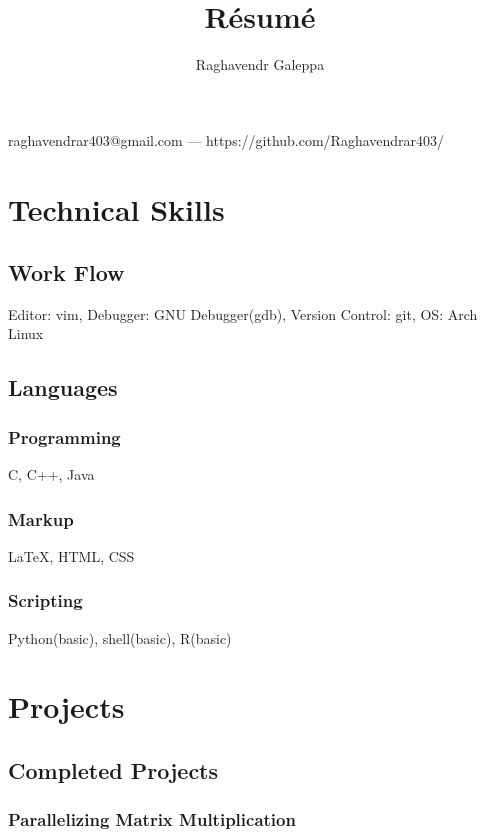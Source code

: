\documentclass{article}
\makeatletter
\renewcommand{\maketitle}{
\begin{center} 
{\huge\bfseries
\theauthor}

raghavendrar403@gmail.com --- https://github.com/Raghavendrar403/

\end{center}

}
\makeatother
\begin{document}
\title{R\'esum\'e}
\author{Raghavendr Galeppa}

\maketitle

\section{Technical Skills}

\subsection{Work Flow}

Editor: vim, Debugger: GNU Debugger(gdb), Version Control: git, OS: Arch Linux

\subsection{Languages}

\subsubsection{Programming}

C, C++, Java

\subsubsection{Markup}

{\LaTeX}, HTML, CSS

\subsubsection{Scripting}

Python(basic), shell(basic), R(basic)

\section {Projects}

\subsection{Completed Projects}

\subsubsection{Parallelizing Matrix Multiplication} 
\end{document}
